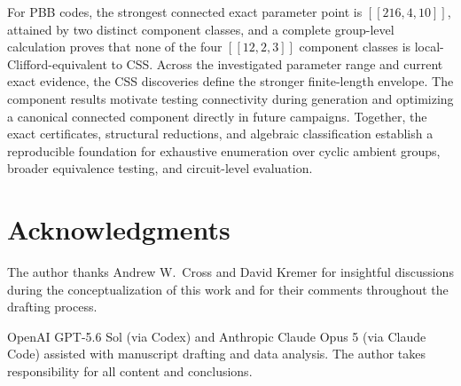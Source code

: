 \documentclass[aps,prx,twocolumn,superscriptaddress,nofootinbib,floatfix]{revtex4-2}
\newcommand{\code}[1]{\ensuremath{\left[\!\left[#1\right]\!\right]}}
\begin{document}
For PBB codes, the strongest connected exact parameter point is
$\code{216,4,10}$, attained by two distinct component classes, and a complete
group-level calculation proves that none of
the four $\code{12,2,3}$ component classes is local-Clifford-equivalent to CSS.
Across the investigated parameter range and current exact evidence, the CSS
discoveries define the stronger finite-length envelope.  The component results
motivate testing connectivity during generation and optimizing a canonical connected
component directly in future campaigns.  Together, the exact certificates,
structural reductions, and algebraic classification establish a reproducible
foundation for exhaustive enumeration over cyclic ambient groups, broader
equivalence testing, and circuit-level evaluation.

\section*{Acknowledgments}

The author thanks Andrew W.\ Cross and David Kremer for insightful
discussions during the conceptualization of this work and for their
comments throughout the drafting process.

OpenAI GPT-5.6 Sol (via Codex) and Anthropic Claude Opus 5 (via Claude Code)
assisted with manuscript drafting and data analysis.  The author takes
responsibility for all content and conclusions.



\end{document}
